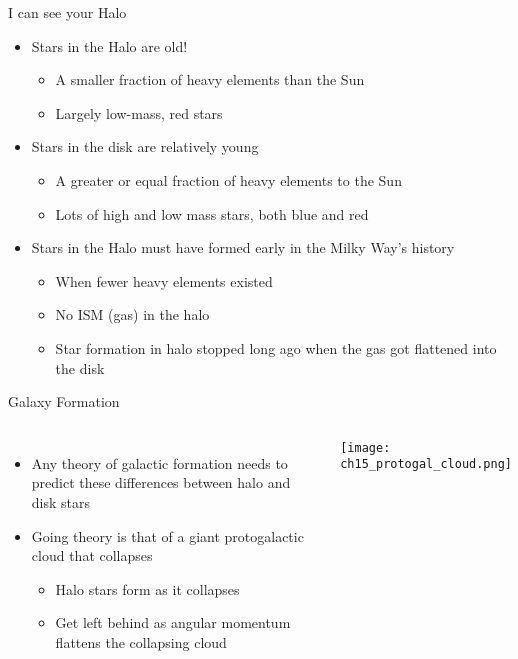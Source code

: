 \documentclass[pdf,aspectratio=169]{beamer}
\begin{document}
\begin{frame}{I can see your Halo}
  \begin{itemize}
	\item Stars in the Halo are old!
	  \begin{itemize}
		\item A smaller fraction of heavy elements than the Sun
		\item Largely low-mass, red stars
	  \end{itemize}
	\item Stars in the disk are relatively young
	  \begin{itemize}
		\item A greater or equal fraction of heavy elements to the Sun
		\item Lots of high and low mass stars, both blue and red
	  \end{itemize}
	\item Stars in the Halo must have formed \alert{early} in the Milky Way's history
	  \begin{itemize}
		\item When fewer heavy elements existed
		\item No ISM (gas) in the halo
		\item Star formation in halo stopped long ago when the gas got flattened into the disk
	  \end{itemize}
  \end{itemize}
\end{frame}

\begin{frame}{Galaxy Formation}
  \begin{columns}
	\begin{itemize}
	  \item Any theory of galactic formation needs to predict these differences between halo and disk stars
	  \item Going theory is that of a giant \alert{protogalactic cloud} that collapses
		\begin{itemize}
		  \item Halo stars form as it collapses
		  \item Get left behind as angular momentum flattens the collapsing cloud
		\end{itemize}
	\end{itemize}
	\begin{center}
	  \texttt{[image: ch15\_protogal\_cloud.png]}
	\end{center}
  \end{columns}
\end{frame}
\end{document}
